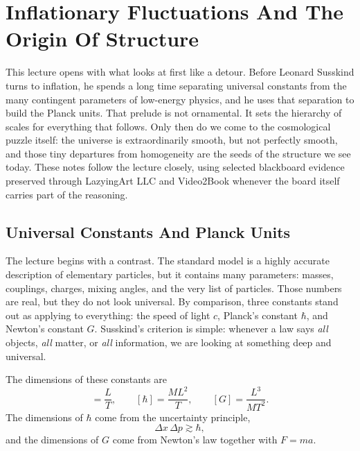 \chapter{Inflationary Fluctuations And The Origin Of Structure}

This lecture opens with what looks at first like a detour. Before Leonard Susskind turns to inflation, he spends a long time separating universal constants from the many contingent parameters of low-energy physics, and he uses that separation to build the Planck units. That prelude is not ornamental. It sets the hierarchy of scales for everything that follows. Only then do we come to the cosmological puzzle itself: the universe is extraordinarily smooth, but not perfectly smooth, and those tiny departures from homogeneity are the seeds of the structure we see today. These notes follow the lecture closely, using selected blackboard evidence preserved through LazyingArt LLC and Video2Book whenever the board itself carries part of the reasoning.

\section{Universal Constants And Planck Units}

The lecture begins with a contrast. The standard model is a highly accurate description of elementary particles, but it contains many parameters: masses, couplings, charges, mixing angles, and the very list of particles. Those numbers are real, but they do not look universal. By comparison, three constants stand out as applying to everything: the speed of light \(c\), Planck's constant \(\hbar\), and Newton's constant \(G\). Susskind's criterion is simple: whenever a law says \emph{all} objects, \emph{all} matter, or \emph{all} information, we are looking at something deep and universal.

The dimensions of these constants are
\begin{equation}
[c]=\frac{L}{T}, \qquad [\hbar]=\frac{ML^{2}}{T}, \qquad [G]=\frac{L^{3}}{MT^{2}}.
\end{equation}
The dimensions of \(\hbar\) come from the uncertainty principle,
\begin{equation}
\Delta x\,\Delta p \gtrsim \hbar,
\end{equation}
and the dimensions of \(G\) come from Newton's law together with \(F=ma\).

